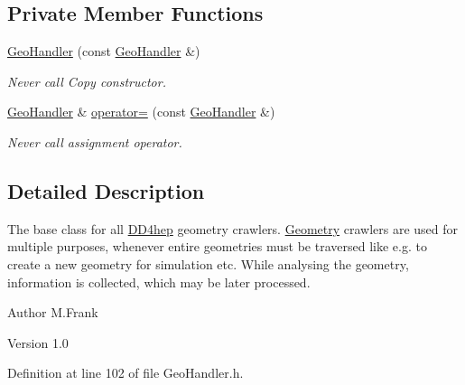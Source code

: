 \subsection*{Private Member Functions}
\begin{DoxyCompactItemize}
\item 
\hyperlink{class_d_d4hep_1_1_geometry_1_1_geo_handler_acade5475bb3291d079f7eda3daded0e7}{GeoHandler} (const \hyperlink{class_d_d4hep_1_1_geometry_1_1_geo_handler}{GeoHandler} \&)
\begin{DoxyCompactList}\small\item\em Never call Copy constructor. \item\end{DoxyCompactList}\item 
\hyperlink{class_d_d4hep_1_1_geometry_1_1_geo_handler}{GeoHandler} \& \hyperlink{class_d_d4hep_1_1_geometry_1_1_geo_handler_a477f807851e2177e48daa15e6d88d30e}{operator=} (const \hyperlink{class_d_d4hep_1_1_geometry_1_1_geo_handler}{GeoHandler} \&)
\begin{DoxyCompactList}\small\item\em Never call assignment operator. \item\end{DoxyCompactList}\end{DoxyCompactItemize}


\subsection{Detailed Description}
The base class for all \hyperlink{namespace_d_d4hep}{DD4hep} geometry crawlers. \hyperlink{namespace_d_d4hep_1_1_geometry}{Geometry} crawlers are used for multiple purposes, whenever entire geometries must be traversed like e.g. to create a new geometry for simulation etc. While analysing the geometry, information is collected, which may be later processed.

\begin{DoxyAuthor}{Author}
M.Frank 
\end{DoxyAuthor}
\begin{DoxyVersion}{Version}
1.0 
\end{DoxyVersion}


Definition at line 102 of file GeoHandler.h.

